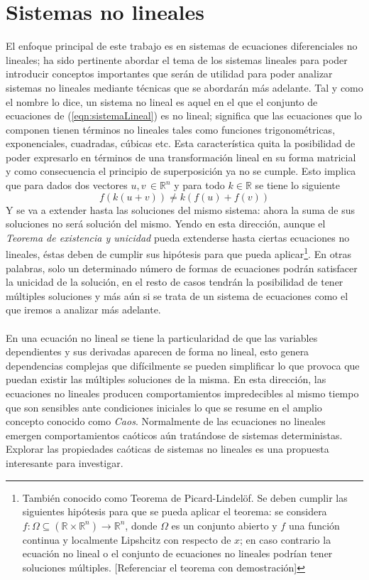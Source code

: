 \section{Sistemas no lineales}
El enfoque principal de este trabajo es en sistemas de ecuaciones diferenciales no lineales; ha sido pertinente abordar el tema de los sistemas lineales para poder introducir conceptos importantes que serán de utilidad para poder analizar sistemas no lineales mediante técnicas que se abordarán más adelante. Tal y como el nombre lo dice, un sistema no lineal es aquel en el que el conjunto de ecuaciones de (\ref{eqn:sistemaLineal}) es no lineal; significa que las ecuaciones que lo componen tienen términos no lineales tales como funciones trigonométricas, exponenciales, cuadradas, cúbicas etc. Esta característica quita la posibilidad de poder expresarlo en términos de una transformación lineal en su forma matricial y como consecuencia el principio de superposición ya no se cumple. Esto implica que para dados dos vectores $u,v\, \in\mathbb{R}^n$ y para todo $k\in\mathbb{R}$ se tiene lo siguiente
$$f(k(u+v))\neq k\left (f(u)+f(v)\right )$$
Y se va a extender hasta las soluciones del mismo sistema: ahora la suma de sus soluciones no será solución del mismo. Yendo en esta dirección, aunque el \textit{Teorema de existencia y unicidad} pueda extenderse hasta ciertas ecuaciones no lineales, éstas deben de cumplir sus hipótesis para que pueda aplicar\footnote{También conocido como Teorema de Picard-Lindelöf. Se deben cumplir las siguientes hipótesis para que se pueda aplicar el teorema: se considera $f:\Omega\subseteq (\mathbb{R}\times\mathbb{R}^n)\to\mathbb{R}^n$, donde $\Omega$ es un conjunto abierto y $f$ una función continua y localmente Lipshcitz con respecto de $x$; en caso contrario la ecuación no lineal o el conjunto de ecuaciones no lineales podrían tener soluciones múltiples. [Referenciar el teorema con demostración]}. En otras palabras, solo un determinado número de formas de ecuaciones podrán satisfacer la unicidad de la solución, en el resto de casos tendrán la posibilidad de tener múltiples soluciones y más aún si se trata de un sistema de ecuaciones como el que iremos a analizar más adelante.\\
\\
En una ecuación no lineal se tiene la particularidad de que las variables dependientes y sus derivadas aparecen de forma no lineal, esto genera dependencias complejas que difícilmente se pueden simplificar lo que provoca que puedan existir las múltiples soluciones de la misma. En esta dirección, las ecuaciones no lineales producen comportamientos impredecibles al mismo tiempo que son sensibles ante condiciones iniciales lo que se resume en el amplio concepto conocido como \textit{Caos}. Normalmente de las ecuaciones no lineales emergen comportamientos caóticos aún tratándose de sistemas deterministas. Explorar las propiedades caóticas de sistemas no lineales es una propuesta interesante para investigar.\\
